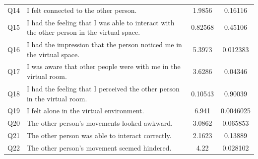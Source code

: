 \documentclass[english,runningheads,a4paper]{llncs}[2018/03/10]
\begin{document}
\begin{table}[tb]
\begin{tabularx}{\textwidth}{c@{\hskip 0.3cm} X@{\hskip 0.5cm} S[round-mode=places,round-precision=3] S[round-mode=places,round-precision=3]}
        Q14 & I felt connected to the other person.  &1.9856 & 0.16116 \\
        Q15 & I had the feeling that I was able to interact with the other person in the virtual space. & 0.82568& 0.45106\\
        Q16 & I had the impression that the person noticed me in the virtual space. &5.3973 &0.012383 \\
        Q17 & I was aware that other people were with me in the virtual room. &3.6286 &0.04346 \\
        Q18 & I had the feeling that I perceived the other person in the virtual room. & 0.10543& 0.90039\\
        Q19 & I felt alone in the virtual environment.  & 6.941 & 0.0046025 \\
        Q20 & The other person's movements looked awkward. &3.0862 & 0.065853\\
        Q21 & The other person was able to interact correctly. &2.1623  &0.13889 \\
        Q22 & The other person's movement seemed hindered.& 4.22   & 0.028102 \\
        \bottomrule
    \end{tabularx}
    \label{tab:anova_presence}
\end{table}
\end{document}
